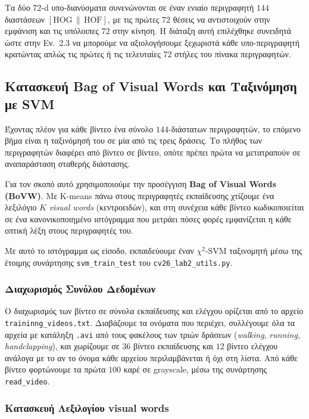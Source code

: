 \documentclass[12pt, a4paper]{article}
\begin{document}
Τα δύο $72$-d υπο-διανύσματα συνενώνονται σε έναν ενιαίο περιγραφητή
$144$ διαστάσεων $[\text{HOG}\,\|\,\text{HOF}]$, με τις πρώτες $72$
θέσεις να αντιστοιχούν στην εμφάνιση και τις υπόλοιπες $72$ στην
κίνηση. Η διάταξη αυτή επιλέχθηκε συνειδητά ώστε στην Εν.~2.3 να
μπορούμε να αξιολογήσουμε ξεχωριστά κάθε υπο-περιγραφητή κρατώντας
απλώς τις πρώτες ή τις τελευταίες $72$ στήλες του πίνακα περιγραφητών.

\subsection{Κατασκευή Bag of Visual Words και Ταξινόμηση με SVM}

Έχοντας πλέον για κάθε βίντεο ένα σύνολο $144$-διάστατων περιγραφητών,
το επόμενο βήμα είναι η ταξινόμησή του σε μία από τις τρεις δράσεις. Το
πλήθος των περιγραφητών διαφέρει από βίντεο σε βίντεο, οπότε πρέπει
πρώτα να μετατραπούν σε αναπαράσταση σταθερής διάστασης.

Για τον σκοπό αυτό χρησιμοποιούμε την προσέγγιση \textbf{Bag of Visual
Words (BoVW)}. Με K-means πάνω στους περιγραφητές εκπαίδευσης χτίζουμε
ένα λεξιλόγιο $K$ \emph{visual words} (κεντροειδών), και στη συνέχεια
κάθε βίντεο κωδικοποιείται σε ένα κανονικοποιημένο ιστόγραμμα που μετράει
πόσες φορές εμφανίζεται η κάθε οπτική λέξη στους περιγραφητές του.

Με αυτό το ιστόγραμμα ως είσοδο, εκπαιδεύουμε έναν $\chi^2$-SVM
ταξινομητή μέσω της έτοιμης συνάρτησης \texttt{svm\_train\_test} του
\texttt{cv26\_lab2\_utils.py}.

\subsubsection{Διαχωρισμός Συνόλου Δεδομένων}

Ο διαχωρισμός των βίντεο σε σύνολα εκπαίδευσης και ελέγχου ορίζεται από
το αρχείο \texttt{traininng\_videos.txt}.
Διαβάζουμε τα ονόματα που περιέχει, συλλέγουμε όλα τα αρχεία με κατάληξη \texttt{.avi} από
τους φακέλους των τριών δράσεων (\textit{walking}, \textit{running},
\textit{handclapping}), και χωρίζουμε σε $36$ βίντεο εκπαίδευσης και $12$
βίντεο ελέγχου ανάλογα με το αν το όνομα κάθε αρχείου περιλαμβάνεται ή
όχι στη λίστα. Από κάθε βίντεο φορτώνουμε τα πρώτα $100$ καρέ σε
grayscale, μέσω της συνάρτησης \texttt{read\_video}.

\subsubsection{Κατασκευή Λεξιλογίου visual words}
\end{document}

